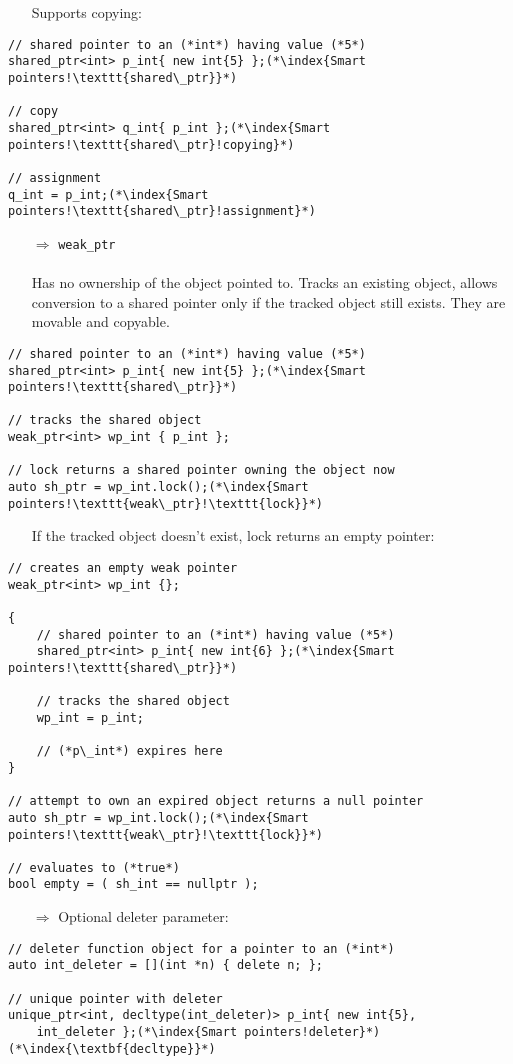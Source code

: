 \documentclass[10pt]{book}
\begin{document}
\begin{enumerate}
\item[] Supports copying:
\end{enumerate}
\begin{lstlisting}
// shared pointer to an (*int*) having value (*5*)
shared_ptr<int> p_int{ new int{5} };(*\index{Smart pointers!\texttt{shared\_ptr}}*)

// copy
shared_ptr<int> q_int{ p_int };(*\index{Smart pointers!\texttt{shared\_ptr}!copying}*)

// assignment
q_int = p_int;(*\index{Smart pointers!\texttt{shared\_ptr}!assignment}*)
\end{lstlisting}
\begin{enumerate}
\item[$\Rightarrow$] \texttt{weak\_ptr}\\ \\
Has no ownership of the object pointed to. Tracks an existing object, allows conversion to a shared pointer only if the tracked object still exists. They are movable and copyable. 
\end{enumerate}
\begin{lstlisting}
// shared pointer to an (*int*) having value (*5*)
shared_ptr<int> p_int{ new int{5} };(*\index{Smart pointers!\texttt{shared\_ptr}}*)

// tracks the shared object
weak_ptr<int> wp_int { p_int };

// lock returns a shared pointer owning the object now
auto sh_ptr = wp_int.lock();(*\index{Smart pointers!\texttt{weak\_ptr}!\texttt{lock}}*)
\end{lstlisting}
\begin{enumerate}
\item[] If the tracked object doesn't exist, lock returns an empty pointer:
\end{enumerate}
\begin{lstlisting}
// creates an empty weak pointer
weak_ptr<int> wp_int {};

{
    // shared pointer to an (*int*) having value (*5*)
    shared_ptr<int> p_int{ new int{6} };(*\index{Smart pointers!\texttt{shared\_ptr}}*)

    // tracks the shared object
    wp_int = p_int;
    
    // (*p\_int*) expires here
}

// attempt to own an expired object returns a null pointer
auto sh_ptr = wp_int.lock();(*\index{Smart pointers!\texttt{weak\_ptr}!\texttt{lock}}*)

// evaluates to (*true*)
bool empty = ( sh_int == nullptr );
\end{lstlisting}
\begin{enumerate}
\item[$\Rightarrow$] Optional deleter parameter:
\end{enumerate}
\begin{lstlisting}
// deleter function object for a pointer to an (*int*)
auto int_deleter = [](int *n) { delete n; };

// unique pointer with deleter
unique_ptr<int, decltype(int_deleter)> p_int{ new int{5},
    int_deleter };(*\index{Smart pointers!deleter}*)(*\index{\textbf{decltype}}*)
\end{lstlisting}
%
%
\end{document}
